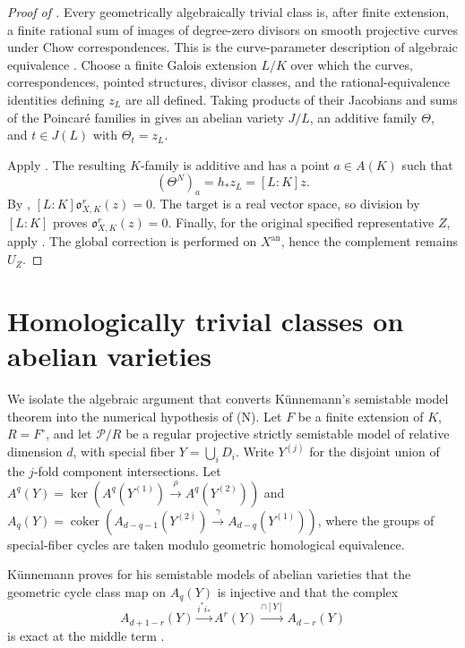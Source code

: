 \documentclass[11pt,reqno]{amsart}
\theoremstyle{definition}
\theoremstyle{remark}
\newcommand{\an}{\mathrm{an}}
\newcommand{\Obs}{\mathfrak o}
\numberwithin{equation}{section}
\begin{document}
\begin{proof}[Proof of ]
Every geometrically algebraically trivial class is, after finite
extension, a finite rational sum of images of degree-zero divisors
on smooth projective curves under Chow correspondences.  This is
the curve-parameter description of algebraic equivalence
\cite{ACMV}.  Choose a finite Galois extension $L/K$ over which
the curves, correspondences, pointed structures, divisor classes,
and the rational-equivalence identities defining $z_L$ are all
defined.  Taking products of their Jacobians and sums of the
Poincar\'e families in  gives an abelian variety
$J/L$, an additive family $\Theta$, and $t\in J(L)$ with
$\Theta_t=z_L$.

Apply .  The resulting $K$-family is additive and
has a point $a\in A(K)$ such that
\begin{equation}\label{eq:norm}
           (\Theta^N)_a=h_*z_L=[L:K]z.
\end{equation}
By ,
$[L:K]\Obs^r_{X,K}(z)=0$.  The target is a real vector
space, so division by $[L:K]$ proves $\Obs^r_{X,K}(z)=0$.
Finally, for the original specified representative $Z$, apply
.  The global correction is performed on
$X^{\an}$, hence the complement remains $U_Z$.
\end{proof}

\section{Homologically trivial classes on abelian varieties}
\label{sec:abelianlocal}

We isolate the algebraic argument that converts K\"unnemann's
semistable model theorem into the numerical hypothesis of (N).
Let $F$ be a finite extension of $K$, $R=F^\circ$, and let
$\mathcal P/R$ be a regular projective strictly semistable model
of relative dimension $d$, with special fiber
$Y=\bigcup_i D_i$.  Write $Y^{(j)}$ for the disjoint union of the
$j$-fold component intersections.  Let
$A^q(Y)=\ker(A^q(Y^{(1)})\xrightarrow{\rho}A^q(Y^{(2)}))$
and
$A_q(Y)=\operatorname{coker}(A_{d-q-1}(Y^{(2)})
\xrightarrow{\gamma} A_{d-q}(Y^{(1)}))$, where the groups of
special-fiber cycles are taken modulo geometric homological
equivalence.

K\"unnemann proves for his semistable models of abelian varieties
that the geometric cycle class map on $A_q(Y)$ is injective and
that the complex
\begin{equation}\label{eq:kunn}
 A_{d+1-r}(Y)\xrightarrow{i^*i_*} A^r(Y)
               \xrightarrow{\cap[Y]} A_{d-r}(Y)
\end{equation}
is exact at the middle term
\cite[Theorems~5.6 and 6.6; \S5.8]{Kunnemann2001}.
\end{document}
